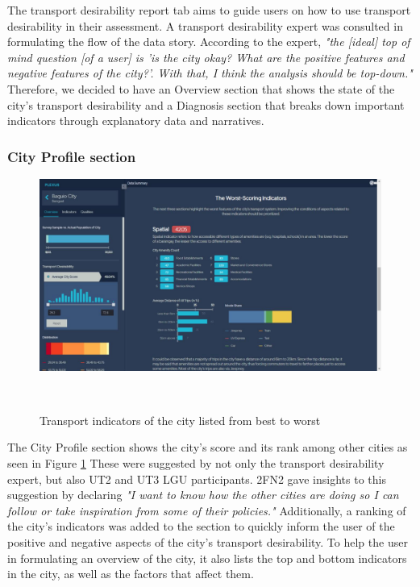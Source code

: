 \documentclass{sigchi}
\begin{document}
The transport desirability report tab aims to guide users on how to use transport desirability in their assessment. A transport desirability expert was consulted in formulating the flow of the data story. According to the expert, \textit{"the [ideal] top of mind question [of a user] is 'is the city okay? What are the positive features and negative features of the city?'. With that, I think the analysis should be top-down."} Therefore, we decided to have an Overview section that shows the state of the city's transport desirability and a Diagnosis section that breaks down important indicators through explanatory data and narratives.

\subsubsection{City Profile section}
\begin{figure}
\centering
  \includegraphics[width=0.9\columnwidth]{figures/latest-screens/city-1.jpg}
  \caption{Transport indicators of the city listed from best to worst}~\label{fig:CityProf}
\end{figure}

The City Profile section shows the city's score and its rank among other cities as seen in Figure \ref{fig:CityProf} These were suggested by not only the transport desirability expert, but also UT2 and UT3 LGU participants. 2FN2 gave insights to this suggestion by declaring \textit{"I want to know how the other cities are doing so I can follow or take inspiration from some of their policies."} Additionally, a ranking of the city's indicators was added to the section to quickly inform the user of the positive and negative aspects of the city's transport desirability. To help the user in formulating an overview of the city, it also lists the top and bottom indicators in the city, as well as the factors that affect them.
\end{document}
